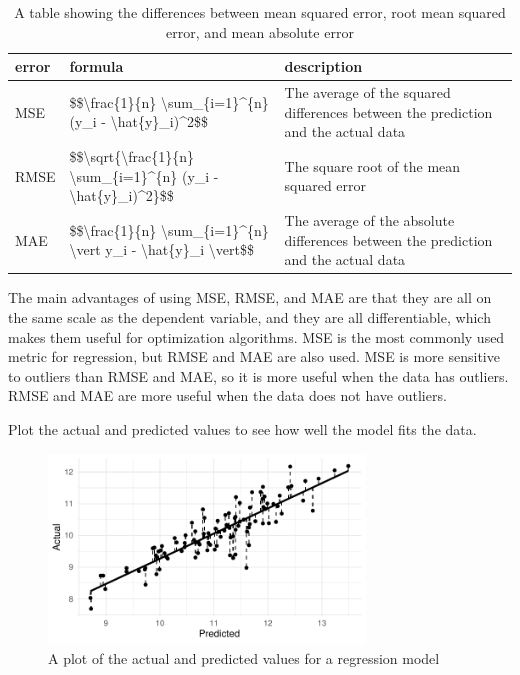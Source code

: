 \documentclass[
  letterpaper,
]{latex/krantz}
\begin{document}
\hypertarget{tbl-pda-error-metrics}{}
\begin{table}
\caption{\label{tbl-pda-error-metrics}A table showing the differences between mean squared error, root mean
squared error, and mean absolute error }\tabularnewline

\centering
\begin{tabular}{l|l|l}
\hline
error & formula & description\\
\hline
MSE & \$\$\textbackslash{}frac\{1\}\{n\} \textbackslash{}sum\_\{i=1\}\textasciicircum{}\{n\} (y\_i - \textbackslash{}hat\{y\}\_i)\textasciicircum{}2\$\$ & The average of the squared differences between the prediction and the actual data\\
\hline
RMSE & \$\$\textbackslash{}sqrt\{\textbackslash{}frac\{1\}\{n\} \textbackslash{}sum\_\{i=1\}\textasciicircum{}\{n\} (y\_i - \textbackslash{}hat\{y\}\_i)\textasciicircum{}2\}\$\$ & The square root of the mean squared error\\
\hline
MAE & \$\$\textbackslash{}frac\{1\}\{n\} \textbackslash{}sum\_\{i=1\}\textasciicircum{}\{n\} \textbackslash{}vert y\_i - \textbackslash{}hat\{y\}\_i \textbackslash{}vert\$\$ & The average of the absolute differences between the prediction and the actual data\\
\hline
\end{tabular}
\end{table}

The main advantages of using MSE, RMSE, and MAE are that they are all on
the same scale as the dependent variable, and they are all
differentiable, which makes them useful for optimization algorithms. MSE
is the most commonly used metric for regression, but RMSE and MAE are
also used. MSE is more sensitive to outliers than RMSE and MAE, so it is
more useful when the data has outliers. RMSE and MAE are more useful
when the data does not have outliers.

Plot the actual and predicted values to see how well the model fits the
data.

\begin{figure}[h]

{\centering \includegraphics[width=0.75\textwidth,height=\textheight]{prediction_files/figure-pdf/pda-regression-plot-1.pdf}

}

\caption{A plot of the actual and predicted values for a regression
model}

\end{figure}
\end{document}
